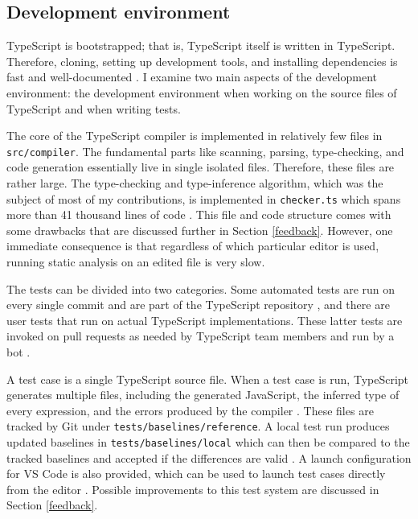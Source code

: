 \documentclass[12pt]{scrartcl}
\def\code#1{\texttt{\frenchspacing#1}}
\begin{document}
\subsection{Development environment}

TypeScript is bootstrapped; that is, TypeScript itself is written in TypeScript. Therefore, cloning, setting up development tools, and installing dependencies is fast and well-documented \cite{ContributingGuidelines}. I examine two main aspects of the development environment: the development environment when working on the source files of TypeScript and when writing tests.

The core of the TypeScript compiler is implemented in relatively few files in \break\code{src/compiler}. The fundamental parts like scanning, parsing, type-checking, and code generation essentially live in single isolated files. Therefore, these files are rather large. The type-checking and type-inference algorithm, which was the subject of most of my contributions, is implemented in \code{checker.ts} which spans more than 41 thousand lines of code \cite{CheckerFile}. This file and code structure comes with some drawbacks that are discussed further in Section \ref{feedback}. However, one immediate consequence is that regardless of which particular editor is used, running static analysis on an edited file is very slow.

The tests can be divided into two categories. Some automated tests are run on every single commit and are part of the TypeScript repository \cite{ContributingGuidelines}, and there are user tests that run on actual TypeScript implementations. These latter tests are invoked on pull requests as needed by TypeScript team members and run by a bot \cite{UserTests}.

A test case is a single TypeScript source file. When a test case is run, TypeScript generates multiple files, including the generated JavaScript, the inferred type of every expression, and the errors produced by the compiler \cite{ContributingGuidelines}. These files are tracked by Git under \code{tests/baselines/reference}. A local test run produces updated baselines in \code{tests/baselines/local} which can then be compared to the tracked baselines and accepted if the differences are valid \cite{ContributingGuidelines}. A launch configuration for VS Code is also provided, which can be used to launch test cases directly from the editor \cite{ContributingGuidelines}. Possible improvements to this test system are discussed in Section \ref{feedback}.
\end{document}
